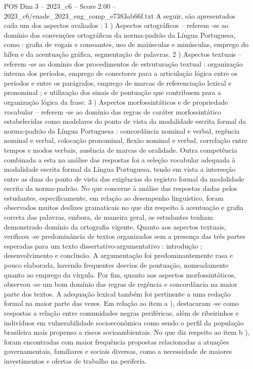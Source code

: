 \begin{textsample}{POS Dim 3 – 2023\_c6 – Score 2.00 – 2023\_c6/enade\_2023\_eng\_comp\_e7383ab66f.txt}
A seguir, são apresentados cada um dos aspectos avaliados : 1 ) Aspectos ortográficos – referem -se ao domínio das convenções ortográficas da norma-padrão da Língua Portuguesa, como : grafia de vogais e consoantes, uso de maiúsculas e minúsculas, emprego do hífen e da acentuação gráfica, segmentação de palavras. 2 ) Aspectos textuais – referem -se ao domínio dos procedimentos de estruturação textual : organização interna dos períodos, emprego de conectores para a articulação lógica entre os períodos e entre os parágrafos, emprego de marcas de referenciação lexical e pronominal ; e utilização dos sinais de pontuação que contribuem para a organização lógica da frase. 3 ) Aspectos morfossintáticos e de propriedade vocabular – referem -se ao domínio das regras de caráter morfossintático estabelecidas como modelares do ponto de vista da modalidade escrita formal da norma-padrão da Língua Portuguesa : concordância nominal e verbal, regência nominal e verbal, colocação pronominal, flexão nominal e verbal, correlação entre tempos e modos verbais, ausência de marcas de oralidade.
Outra competência combinada a esta na análise das respostas foi a seleção vocabular adequada à modalidade escrita formal da Língua Portuguesa, tendo em vista a interseção entre as duas do ponto de vista das exigências do registro formal da modalidade escrita da norma-padrão.
No que concerne à análise das respostas dadas pelos estudantes, especificamente, em relação ao desempenho linguístico, foram observados muitos deslizes gramaticais no que diz respeito à acentuação e grafia correta das palavras, embora, de maneira geral, os estudantes tenham demonstrado domínio da ortografia vigente.
Quanto aos aspectos textuais, verificou -se predominância de textos organizados sem a presença das três partes esperadas para um texto dissertativo-argumentativo : introdução ; desenvolvimento e conclusão.
A argumentação foi predominantemente rasa e pouco elaborada, havendo frequentes desvios de pontuação, nomeadamente quanto ao emprego da vírgula.
Por fim, quanto aos aspectos morfossintáticos, observou -se um bom domínio das regras de regência e concordância na maior parte dos textos.
A adequação lexical também foi pertinente a uma redação formal na maior parte das vezes.
Em relação ao item a ), destacaram -se como respostas a relação entre comunidades negras periféricas, além de ribeirinhos e indivíduos em vulnerabilidade socioeconômica como sendo o perfil da população brasileira mais propenso a riscos socioambientais.
No que diz respeito ao item b ), foram encontradas com maior frequência propostas relacionadas a atuações governamentais, familiares e sociais diversas, como a necessidade de maiores investimentos e ofertas de trabalho na periferia.

\end{textsample}
